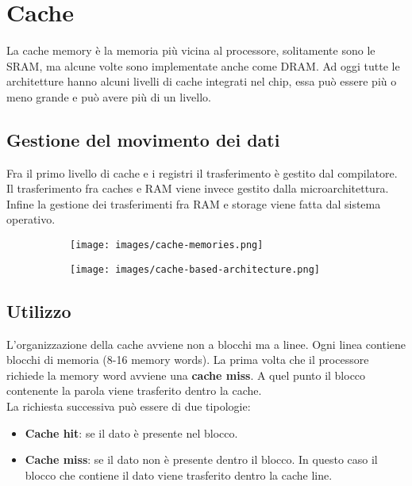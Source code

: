 \newpage
\section{Cache}
La cache memory è la memoria più vicina al processore, solitamente sono le SRAM, ma alcune volte sono implementate anche come DRAM. Ad oggi tutte le architetture hanno alcuni livelli di cache integrati nel chip, essa può essere più o meno grande e può avere più di un livello.

\subsection{Gestione del movimento dei dati}
Fra il primo livello di cache e i registri il trasferimento è gestito dal compilatore. Il trasferimento fra caches e RAM viene invece gestito dalla microarchitettura. Infine la gestione dei trasferimenti fra RAM e storage viene fatta dal sistema operativo.

\begin{figure}[h!]
	\centering
	\begin{subfigure}{.45\textwidth}
		\centering
		\texttt{[image: images/cache-memories.png]}
		\caption{}
	\end{subfigure}
	\begin{subfigure}{.45\textwidth}
		\centering
		\texttt{[image: images/cache-based-architecture.png]}
		\caption{}
	\end{subfigure}
\end{figure}


\subsection{Utilizzo}
L'organizzazione della cache avviene non a blocchi ma a linee. Ogni linea contiene blocchi di memoria (8-16 memory words). La prima volta che il processore richiede la memory word avviene una \textbf{cache miss}. A quel punto il blocco contenente la parola viene trasferito dentro la cache.\\
La richiesta successiva può essere di due tipologie:
\begin{itemize}
	\item \textbf{Cache hit}: se il dato è presente nel blocco.
	\item \textbf{Cache miss}: se il dato non è presente dentro il blocco. In questo caso il blocco che contiene il dato viene trasferito dentro la cache line.
\end{itemize}

